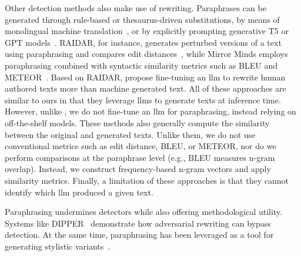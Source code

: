 Other detection methods also make use of rewriting. 
Paraphrases can be generated through rule-based or thesaurus-driven substitutions, by means of monolingual machine translation~\citep{zhou_paraphrase_2021}, or by explicitly prompting generative T5 or GPT models~\citep{kurt_pehlivanoglu_comparative_2024}.
RAIDAR, for instance, generates perturbed versions of a text using paraphrasing and compares edit distances~\citep{mao_raidar_2024}, while Mirror Minds employs paraphrasing combined with syntactic similarity metrics such as BLEU and METEOR~\citep{baradia_mirror_2025}. 
Based on RAIDAR, \citet{li_learning_2025} propose fine-tuning an \ac{llm} to rewrite human authored texts more than machine generated text.
All of these approaches are similar to ours in that they leverage \acp{llm} to generate texts at inference time. 
However, unlike \citet{li_learning_2025}, we do not fine-tune an \ac{llm} for paraphrasing, instead relying on off-the-shelf models.
These methods also generally compute the similarity between the original and generated texts. 
Unlike them, we do not use conventional metrics such as edit distance, BLEU, or METEOR, nor do we perform comparisons at the paraphrase level (e.g., BLEU measures n-gram overlap). 
Instead, we construct frequency-based n-gram vectors and apply similarity metrics.
Finally, a limitation of these approaches is that they cannot identify which \ac{llm} produced a given text.

Paraphrasing undermines detectors while also offering methodological utility. 
Systems like DIPPER~\citep{Krishna_dipper_2023} demonstrate how adversarial rewriting can bypass detection. 
At the same time, paraphrasing has been leveraged as a tool for generating stylistic variants~\citep{mao_raidar_2024,baradia_mirror_2025}.



